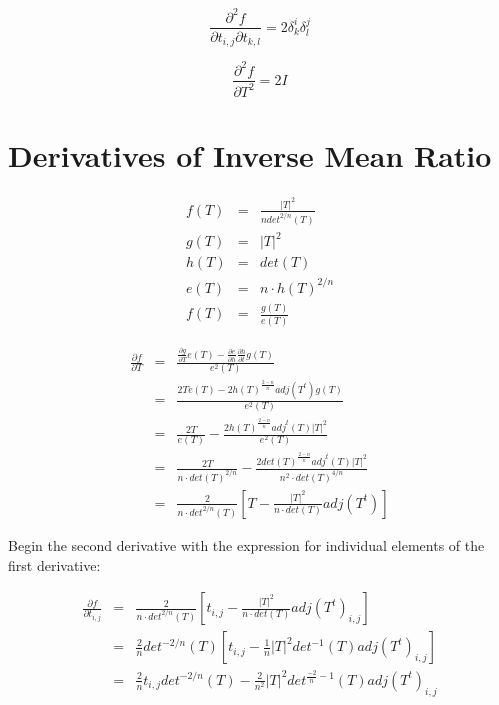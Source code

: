 \documentclass{report}
\begin{document}
\begin{equation}
\frac{\partial^2 f}{\partial t_{i,j} \partial t_{k,l}} = 2 \delta^i_k \delta^j_l \end{equation}

\begin{equation}
\frac{\partial^2 f}{\partial T^2} = 2 I
\end{equation}


\section{Derivatives of Inverse Mean Ratio}

\begin{eqnarray}
f(T) & = & \frac{|T|^2}{n det^{2/n}(T)} \\
g(T) & = & |T|^2 \\
h(T) & = & det(T) \\
e(T) & = & n \cdot h(T)^{2/n} \\
f(T) & = & \frac{g(T)}{e(T)} 
\end{eqnarray}

\begin{eqnarray}
\frac{\partial f}{\partial T} &=& \frac{
\frac{\partial g}{\partial T} e(T) - 
\frac{\partial e}{\partial h} \frac{\partial h}{\partial t} g(T)}
{e^2(T)} \\
&=& 
\frac{2 T e(T) - 
2 h(T)^\frac{2-n}{n} adj(T^t) g(T)}
{e^2(T)} \\
& = &  
\frac{2 T}{e(T)} -
\frac{2 h(T)^{\frac{2-n}{n}} adj^t(T) |T|^2}{e^2(T)} \\
& = &  
\frac{2 T}{n \cdot det(T)^{2/n}} -
\frac{2 det(T)^{\frac{2-n}{n}} adj^t(T) |T|^2}{n^2 \cdot det(T)^{4/n}} \\
& = &  
\frac{2}{n \cdot det^{2/n}(T)}\left[ T - \frac{|T|^2}{n \cdot det(T)} adj(T^t) \right]
\end{eqnarray}

Begin the second derivative with the  expression for individual elements of the first derivative:

\begin{eqnarray}
\frac{\partial f}{\partial t_{i,j}} & = & 
\frac{2}{n \cdot det^{2/n}(T)}\left[ t_{i,j} - \frac{|T|^2}{n \cdot det(T)} adj(T^t)_{i,j} \right] \\
 & = & 
\frac{2}{n}det^{-2/n}(T)\left[ t_{i,j} - \frac{1}{n}|T|^2 det^{-1}(T) adj(T^t)_{i,j}\right] \\
 & = &
\frac{2}{n} t_{i,j} det^{-2/n}(T) - \frac{2}{n^2} |T|^2 det^{\frac{-2}{n} - 1}(T) adj(T^t)_{i,j} 
\end{eqnarray}
\end{document}

